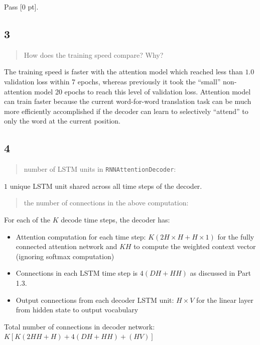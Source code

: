 \documentclass{article}
\begin{document}
Pass [0 pt].
 
\subsection*{3}

\begin{quote}
How does the training speed compare?  Why?
\end{quote}

The training speed is faster with the attention model which reached less than $1.0$ validation loss within 7 epochs, whereas previously it took the ``small'' non-attention model 20 epochs to reach this level of validation loss. Attention model can train faster because the current word-for-word translation task can be much more efficiently accomplished if the decoder can learn to selectively ``attend'' to only the word at the current position.

\subsection*{4}

\begin{quote}
 number of LSTM units in \texttt{RNNAttentionDecoder}:
\end{quote}

$1$ unique LSTM unit shared across all time steps of the decoder.

\begin{quote}
the number of connections in the above computation:
\end{quote}

For each of the $K$ decode time steps, the decoder has:

\begin{itemize}
\item 
Attention computation for each time step: $K(2H\times H+H\times 1)$ for the fully connected attention network and $KH$ to compute the weighted context vector (ignoring softmax computation)

\item 
Connections in each LSTM time step is $4(DH+HH)$ as discussed in Part 1.3. 

\item
Output connections from each decoder LSTM unit: $H\times V$ for the linear layer from hidden state to output vocabulary

\end{itemize}


Total number of connections in decoder network: $K[K(2HH+H)+4(DH+HH)+(HV)]$
\end{document}
